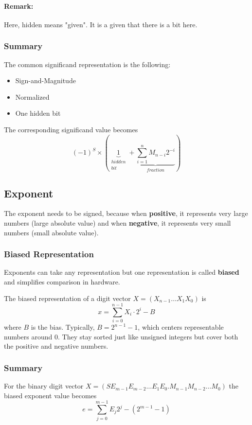 \documentclass[10pt,a4paper]{book}
\begin{document}
\paragraph{Remark:} 
Here, hidden means "given". It is a given that there is a bit here.

\subsubsection{Summary}
The common significand representation is the following:
\begin{itemize}
\item Sign-and-Magnitude
\item Normalized
\item One hidden bit
\end{itemize}
The corresponding significand value becomes
\[(-1)^S\times(\underbrace{1}_{\substack{hidden \\ bit}}+\underbrace{\sum^n_{i=1}M_{n-i}2^{-i}}_{fraction})\]

\subsection{Exponent}
The exponent needs to be signed, because when \textbf{positive}, it represents very large numbers (large absolute value) and when \textbf{negative}, it represents very small numbers (small absolute value).

\subsubsection{Biased Representation}
Exponents can take any representation but one representation is called \textbf{biased} and simplifies comparison in hardware.\par 
The biased representation of a digit vector $X=(X_{n-1}\ldots X_1X_0)$ is 
\[x=\sum^{n-1}_{i=0}X_i\cdot 2^i-B\]
where $B$ is the bias. Typically, $B=2^{n-1}-1$, which centers representable numbers around 0. They stay sorted just like unsigned integers but cover both the positive and negative numbers.

\subsubsection{Summary}
For the binary digit vector $X=(SE_{m-1}E_{m-2}\ldots E_1E_0.M_{n-1}M_{n-2}\ldots M_0)$ the biased exponent value becomes
\[e=\sum^{m-1}_{j=0} E_j2^j-(2^{m-1}-1)\]
\end{document}
